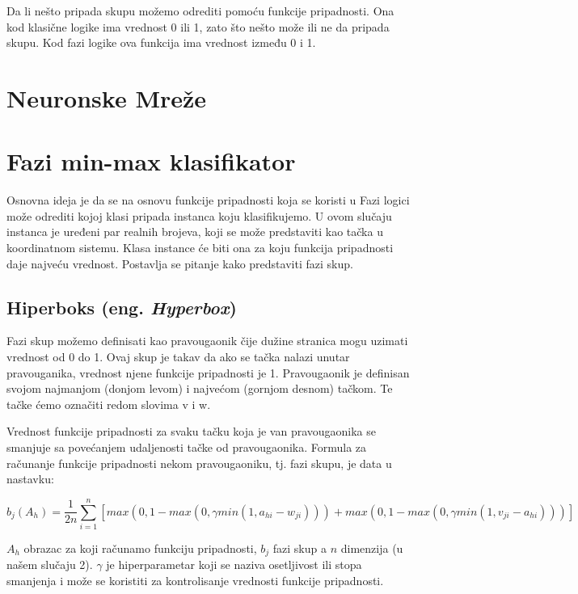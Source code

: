 \documentclass[a4paper]{article}
\begin{document}
Da li nešto pripada skupu možemo odrediti pomoću funkcije pripadnosti. Ona kod klasične logike ima vrednost 0 ili 1, zato što nešto može 
ili ne da pripada skupu. Kod fazi logike ova funkcija ima vrednost između 0 i 1. \cite{fl}


\section{Neuronske Mreže}
\label{neuronskemreze}


\section{Fazi min-max klasifikator}
\label{faziminmaxcl}

Osnovna ideja je da se na osnovu funkcije pripadnosti koja se koristi u Fazi logici može odrediti kojoj klasi pripada instanca koju 
klasifikujemo. U ovom slučaju instanca je uređeni par realnih brojeva, koji se može predstaviti kao tačka u koordinatnom sistemu. 
Klasa instance će biti ona za koju funkcija pripadnosti daje najveću vrednost. Postavlja se pitanje kako predstaviti fazi skup.\cite{mmf}

\subsection{Hiperboks  (eng. \emph{Hyperbox})}
\label{hiperboks}

Fazi skup možemo definisati kao pravougaonik čije dužine stranica mogu uzimati vrednost od 0 do 1. Ovaj skup je takav da ako se tačka 
nalazi unutar pravouganika, vrednost njene funkcije pripadnosti je 1. Pravougaonik je definisan svojom najmanjom (donjom levom) i 
najvećom (gornjom desnom) tačkom. Te tačke ćemo označiti redom slovima v i w.

Vrednost funkcije pripadnosti za svaku tačku koja je van pravougaonika se smanjuje sa povećanjem udaljenosti tačke od pravougaonika. 
Formula za računanje funkcije pripadnosti nekom pravougaoniku, tj. fazi skupu, je data u nastavku:

\begin{equation}
    b_j(A_h) = \frac{1}{2n}\sum_{i=1}^{n}[max(0, 1 - max(0, \gamma min(1, a_{hi}-w_{ji}))) + max(0, 1 - max(0, \gamma min(1, v_{ji}-a_{hi})))]
\end{equation}

$A_h$ obrazac za koji računamo funkciju pripadnosti, $b_j$ fazi skup a $n$ dimenzija (u našem slučaju 2). $\gamma$ je hiperparametar 
koji se naziva osetljivost ili stopa smanjenja i može se koristiti za kontrolisanje vrednosti funkcije pripadnosti.
\end{document}
